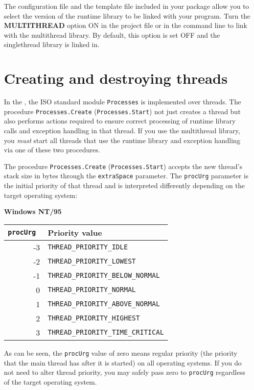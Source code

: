The configuration file and the template file included in your \XDS{}
package allow you to select the version of the runtime library to
be linked with your program. Turn the {\bf MULTITHREAD} option ON
in the project file or in the command line to link with the multithread
library. By default, this option is set OFF and the singlethread
library is linked in.

\section{Creating and destroying threads}
\label{threads:create}

In the , the ISO \mt{}
standard module \verb'Processes' is implemented over threads.
The procedure \verb'Processes.Create' (\verb'Processes.Start') not
just creates a thread but also performs actions required to ensure correct
processing of runtime library calls and exception handling in that
thread. If you use the multithread library, you {\em must}
start all threads that use the runtime
library and exception handling via one of these two procedures.

The procedure \verb'Processes.Create' (\verb'Processes.Start')
accepts the new thread's stack size in bytes through the \verb'extraSpace'
parameter. The \verb'procUrg' parameter is the initial priority of
that thread and is interpreted differently depending on the target
operating system:

{\bf Windows NT/95}

\begin{tabular}{rl}
\tt procUrg & \bf Priority value                   \\
\hline
         -3 & \tt THREAD\_PRIORITY\_IDLE           \\
         -2 & \tt THREAD\_PRIORITY\_LOWEST         \\
         -1 & \tt THREAD\_PRIORITY\_BELOW\_NORMAL  \\
          0 & \tt THREAD\_PRIORITY\_NORMAL         \\
          1 & \tt THREAD\_PRIORITY\_ABOVE\_NORMAL  \\
          2 & \tt THREAD\_PRIORITY\_HIGHEST        \\
          3 & \tt THREAD\_PRIORITY\_TIME\_CRITICAL
\end{tabular}

As can be seen, the \verb'procUrg' value of zero means regular priority
(the priority that the main thread has after it is started)
on all operating systems. If you do not need to alter
thread priority, you may safely pass zero to \verb'procUrg'
regardless of the target operating system.

